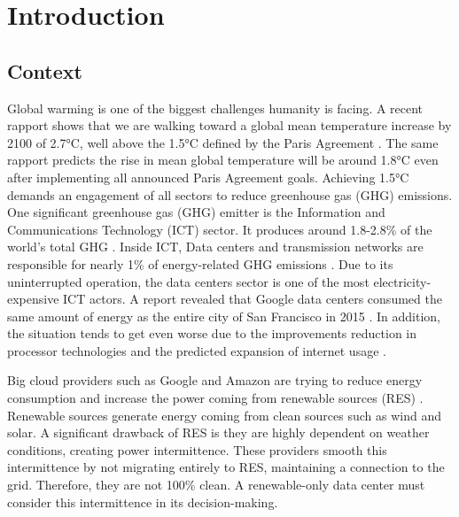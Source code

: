 \chapter{Introduction}
\label{chap1}




\section{Context}

Global warming is one of the biggest challenges humanity is facing. A recent rapport shows that we are walking toward a global mean temperature increase by 2100 of 2.7°C, well above the 1.5°C defined by the Paris Agreement \cite{tracker2022massive}. The same rapport predicts the rise in mean global temperature will be around 1.8°C even after implementing all announced Paris Agreement goals. Achieving 1.5°C demands an engagement of all sectors to reduce greenhouse gas (GHG) emissions. One significant greenhouse gas (GHG) emitter is the Information and Communications Technology (ICT) sector. It produces around 1.8-2.8\% of the world's total GHG \cite{freitag2021climate}. Inside ICT, Data centers and transmission networks are responsible for nearly 1\% of energy-related GHG emissions \cite{centres2022data}. Due to its uninterrupted operation, the data centers sector is one of the most electricity-expensive ICT actors. A report revealed that Google data centers consumed the same amount of energy as the entire city of San Francisco in 2015 \cite{khan2018exploiting}. In addition, the situation tends to get even worse due to the improvements reduction in processor technologies and the predicted expansion of internet usage \cite{cisco2020cisco, freitag2021climate}.

Big cloud providers such as Google and Amazon are trying to reduce energy consumption and increase the power coming from renewable sources (RES) \cite{Masanet984}. Renewable sources generate energy coming from clean sources such as wind and solar. A significant drawback of RES is they are highly dependent on weather conditions, creating power intermittence. These providers smooth this intermittence by not migrating entirely to RES, maintaining a connection to the grid. Therefore, they are not 100\% clean. A renewable-only data center must consider this intermittence in its decision-making. 

